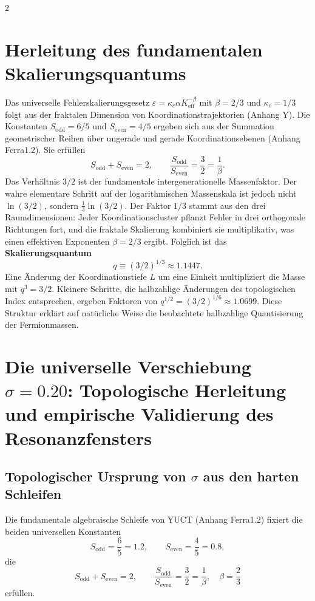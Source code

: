 \documentclass[11pt,a4paper]{article}
\newcommand{\Sodd}{S_{\mathrm{odd}}}
\newcommand{\Seven}{S_{\mathrm{even}}}
\begin{document}
\begin{multicols}{2}
		\section{Herleitung des fundamentalen Skalierungsquantums}
		\label{sec:derivation}
		
		Das universelle Fehlerskalierungsgesetz \(\varepsilon = \kappa_c \alpha K_{\mathrm{eff}}^{-\beta}\) mit \(\beta = 2/3\) und \(\kappa_c = 1/3\) folgt aus der fraktalen Dimension von Koordinationstrajektorien (Anhang Y). Die Konstanten \(\Sodd = 6/5\) und \(\Seven = 4/5\) ergeben sich aus der Summation geometrischer Reihen über ungerade und gerade Koordinationsebenen (Anhang Ferra1.2). Sie erfüllen
		\[
		\Sodd + \Seven = 2, \qquad \frac{\Sodd}{\Seven} = \frac{3}{2} = \frac{1}{\beta}.
		\]
		Das Verhältnis \(3/2\) ist der fundamentale intergenerationelle Massenfaktor. Der wahre elementare Schritt auf der logarithmischen Massenskala ist jedoch nicht \(\ln(3/2)\), sondern \(\frac{1}{3}\ln(3/2)\). Der Faktor \(1/3\) stammt aus den drei Raumdimensionen: Jeder Koordinationscluster pflanzt Fehler in drei orthogonale Richtungen fort, und die fraktale Skalierung kombiniert sie multiplikativ, was einen effektiven Exponenten \(\beta = 2/3\) ergibt. Folglich ist das \textbf{Skalierungsquantum}
		\begin{equation}
			q \equiv (3/2)^{1/3} \approx 1.1447.
		\end{equation}
		Eine Änderung der Koordinationstiefe \(L\) um eine Einheit multipliziert die Masse mit \(q^3 = 3/2\). Kleinere Schritte, die halbzahlige Änderungen des topologischen Index entsprechen, ergeben Faktoren von \(q^{1/2} = (3/2)^{1/6} \approx 1.0699\). Diese Struktur erklärt auf natürliche Weise die beobachtete halbzahlige Quantisierung der Fermionmassen.
		
		\section{Die universelle Verschiebung \(\sigma = 0.20\): Topologische Herleitung und empirische Validierung des Resonanzfensters}
		\label{sec:sigma}
		
		\subsection{Topologischer Ursprung von \(\sigma\) aus den harten Schleifen}
		
		Die fundamentale algebraische Schleife von YUCT (Anhang Ferra1.2) fixiert die beiden universellen Konstanten
		\[
		S_{\mathrm{odd}} = \frac{6}{5} = 1.2,\qquad S_{\mathrm{even}} = \frac{4}{5} = 0.8,
		\]
		die
		\[
		S_{\mathrm{odd}} + S_{\mathrm{even}} = 2,\qquad \frac{S_{\mathrm{odd}}}{S_{\mathrm{even}}} = \frac{3}{2} = \frac{1}{\beta},\quad \beta = \frac{2}{3}
		\]
		erfüllen.
		

\end{multicols}
\end{document}
